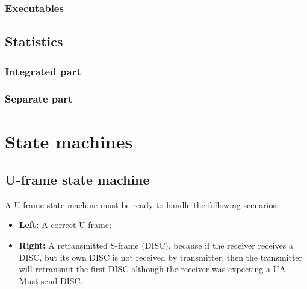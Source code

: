 \documentclass[a4paper, 11pt]{report}
\begin{document}
\subsection{Executables}



\section{Statistics}
\subsection{Integrated part}



\subsection{Separate part}




\restoregeometry

\chapter{State machines}
\section{U-frame state machine}

A U-frame state machine must be ready to handle the following scenarios:
\begin{itemize}
	\item \textbf{Left:} A correct U-frame;
	\item \textbf{Right:} A retransmitted S-frame (DISC), because if the receiver receives a DISC, but its own DISC is not received by transmitter, then the transmitter will retransmit the first DISC although the receiver was expecting a UA. Must send DISC.
\end{itemize}
\end{document}
